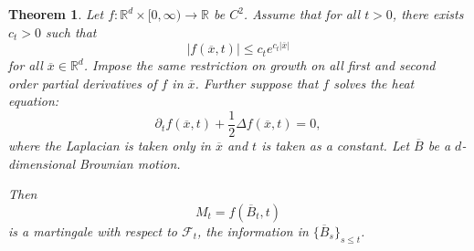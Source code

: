 \documentclass{tufte-handout}
\newcommand*\R{\mathbb{R}}
\newtheorem{thm}{Theorem}[subsection]
\theoremstyle{definition}
\begin{document}
\begin{thm} \label{thm:martbm}
	Let $f: \R^d \times [0,\infty) \to \R$ be $C^2$. Assume that for all $t > 0$, there exists $c_t > 0$ such that \[
		\left| f(\overline{x},t) \right| \le c_t e^{c_t \left| \overline{x} \right|}
	\] for all $\overline{x} \in \R^d$. Impose the same restriction on growth on all first and second order partial derivatives of $f$ in $\overline{x}$.
	Further suppose that $f$ solves the heat equation: \[
		\partial_t f(\overline{x},t) + \frac{1}{2} \Delta f(\overline{x},t) = 0
	,\] where the Laplacian is taken only in $\overline{x}$ and $t$ is taken as a constant. Let $\overline{B}$ be a $d$-dimensional Brownian motion.

	Then \[
		M_t = f(\overline{B}_t, t)
	\] is a martingale with respect to $\mathscr{F}_t$, the information in $\{\overline{B}_s\}_{s\le t}$.
\end{thm}
\end{document}

